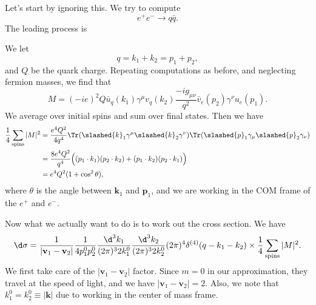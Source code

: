 \documentclass[a4paper]{article}
\begin{document}
Let's start by ignoring this. We try to compute
\[
  e^+ e^- \to q\bar{q}.
\]
The leading process is
\begin{center}
\end{center}
We let
\[
  q = k_1 + k_2 = p_1 + p_2,
\]
and $Q$ be the quark charge. Repeating computations as before, and neglecting fermion masses, we find that
\[
  M = (-ie)^2 Q \bar{u}_q(k_1) \gamma^\mu v_q(k_2) \frac{-ig_{\mu\nu}}{q^2} \bar{v}_e (p_2) \gamma^\nu u_e(p_1).
\]
We average over initial spins and sum over final states. Then we have
\begin{align*}
  \frac{1}{4} \sum_{\mathrm{spins}} |M|^2 &= \frac{e^4 Q^2}{4 q^4} \Tr(\slashed{k}_1 \gamma^\mu \slashed{k}_2 \gamma^\nu) \Tr(\slashed{p}_1 \gamma_\mu \slashed{p}_2 \gamma_\nu)\\
  &= \frac{8 e^4 Q^2}{q^4} \Big((p_1 \cdot k_1) (p_2 \cdot k_2) + (p_1 \cdot k_2) (p_2 \cdot k_1)\Big)\\
  &= e^4 Q^2 (1 + \cos^2 \theta),
\end{align*}
where $\theta$ is the angle between $\mathbf{k}_1$ and $\mathbf{p}_1$, and we are working in the COM frame of the $e^+$ and $e^-$.

Now what we actually want to do is to work out the cross section. We have %
\[
  \d \sigma = \frac{1}{|\mathbf{v}_1 - \mathbf{v}_2|} \frac{1}{4 p_1^0 p_2^0} \frac{\d^3 k_1}{ (2\pi)^3 2 k_1^0} \frac{\d^3 k_2}{(2\pi)^3 2 k_2^0} (2\pi)^4 \delta^{(4)} (q - k_1 - k_2) \times \frac{1}{4}\sum_{\mathrm{spins}} |M|^2.
\]
We first take care of the $|\mathbf{v}_1 - \mathbf{v}_2|$ factor. Since $m = 0$ in our approximation, they travel at the speed of light, and we have $|\mathbf{v}_1 - \mathbf{v}_2| = 2$. Also, we note that $k_1^0 = k_2^0 \equiv |\mathbf{k}|$ due to working in the center of mass frame.
\end{document}
